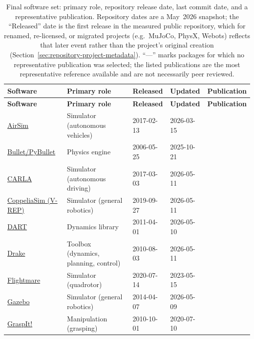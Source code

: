 \begingroup
\singlespacing
\footnotesize
\setlength{\tabcolsep}{4pt}
\begin{longtable}{@{}P{2.5cm}P{3.0cm}llP{2.7cm}@{}}
\caption{Final software set: primary role, repository release date, last commit date, and a representative publication. Repository dates are a May~2026 snapshot; the ``Released'' date is the first release in the measured public repository, which for renamed, re-licensed, or migrated projects (e.g.\ MuJoCo, PhysX, Webots) reflects that later event rather than the project's original creation (Section~\ref{sec:repository-project-metadata}). ``---'' marks packages for which no representative publication was selected; the listed publications are the most representative reference available and are not necessarily peer reviewed.}
\label{tab:final-software-set}\\
\toprule
\textbf{Software} & \textbf{Primary role} & \textbf{Released} & \textbf{Updated} & \textbf{Publication} \\
\midrule
\endfirsthead
\toprule
\textbf{Software} & \textbf{Primary role} & \textbf{Released} & \textbf{Updated} & \textbf{Publication} \\
\midrule
\endhead
\bottomrule
\endlastfoot
\href{https://microsoft.github.io/AirSim}{AirSim} & Simulator (autonomous vehicles) & 2017-02-13 & 2026-03-15 & \citet{sw_airsim} \\
\href{https://pybullet.org}{Bullet/PyBullet} & Physics engine & 2006-05-25 & 2025-10-21 & \citet{sw_pybullet} \\
\href{https://carla.org}{CARLA} & Simulator (autonomous driving) & 2017-03-03 & 2026-05-11 & \citet{sw_carla} \\
\href{https://www.coppeliarobotics.com}{CoppeliaSim (V-REP)} & Simulator (general robotics) & 2019-09-27 & 2026-05-11 & \citet{sw_coppeliasim} \\
\href{https://dartsim.github.io}{DART} & Dynamics library & 2011-04-01 & 2026-05-10 & \citet{sw_dart} \\
\href{https://drake.mit.edu}{Drake} & Toolbox (dynamics, planning, control) & 2010-08-03 & 2026-05-11 & \citet{sw_drake} \\
\href{https://uzh-rpg.github.io/flightmare}{Flightmare} & Simulator (quadrotor) & 2020-07-14 & 2023-05-15 & \citet{sw_flightmare} \\
\href{https://gazebosim.org}{Gazebo} & Simulator (general robotics) & 2014-04-07 & 2026-05-09 & \citet{sw_gazebo} \\
\href{http://graspit-simulator.github.io}{GraspIt!} & Manipulation (grasping) & 2010-10-01 & 2020-07-10 & \citet{sw_graspit} \\

\end{longtable}
